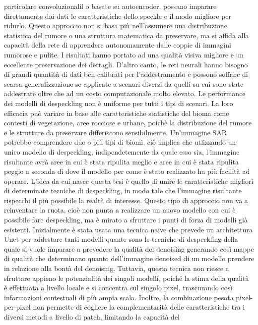 particolare convoluzionalil o basate su autoencoder, possano imparare direttamente dai dati le caratteristiche
dello speckle e il modo migliore per ridurlo. Questo approccio non si basa più nell'assumere una distribuzione 
statistica del rumore o una struttura matematica da preservare, ma si affida alla capacità della rete di 
apprendere autonomamente dalle coppie di immagini rumorose e pulite. I risultati hanno portato ad una qualità 
visiva migliore e un eccellente preservazione dei dettagli. D'altro canto, le reti neurali hanno bisogno 
di grandi quantità di dati ben calibrati per l'addestramento e possono soffrire di scarsa generalizzazione se 
applicate a scenari diversi da quelli su cui sono state addestrate oltre che ad un costo computazionale molto elevato. 
Le performance dei modelli di despeckling non è uniforme per tutti i tipi di scenari. La loro efficacia può variare
in base alle caratteristiche statistiche del bioma come contesti di vegetazione, aree rocciose e urbane, 
poichè la distribuzione del rumore e le strutture da preservare differiscono sensibilmente. Un'immagine SAR potrebbe 
comprendere due o più tipi di biomi, ciò implica che utlizzando un unico modello di despeckling, 
indipendetemente da quale esso sia, l'immagine risultante avrà aree in cui è stata ripulita meglio e aree in cui è 
stata ripulita peggio a seconda di dove il modello per come è stato realizzato ha più facilità ad operare.
L'idea da cui nasce questa tesi è quello di unire le caratteristiche migliori di determinate tecniche di despeckling, 
in modo tale che l'immagine risultante rispecchi il più possibile la realtà di interesse. Questo tipo di approccio non va a 
reinventare la ruota, cioè non punta a realizzare un nuovo modello con cui è possibile fare despeckling, ma è mirato
a sfruttare i punti di forza di modelli già esistenti. Inizialmente è stata usata una tecnica naive che 
prevede un architettura Unet per addestare tanti modelli quante sono le tecniche di despeckling 
della quale si vuole imparare a prevedere la qualità del denoising generando così mappe di qualità 
che determinano quanto dell'immagine denoised di un  modello prendere in relazione alla bontà del denoising.
Tuttavia, questa tecnica non riesce a sfruttare appieno le potenzialità dei singoli modelli, poiché la stima 
della qualità è effettuata a livello locale e si concentra sul singolo pixel, trascurando così informazioni 
contestuali di più ampia scala. Inoltre, la combinazione pesata pixel-per-pixel non permette di cogliere la 
complementarità delle caratteristiche tra i diversi metodi a livello di patch, limitando la capacità del 
